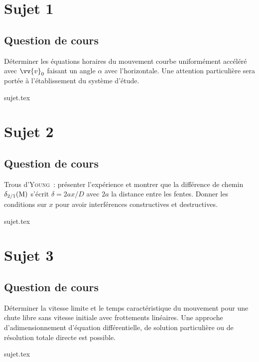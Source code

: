 \documentclass[a4paper, 11pt]{book}
\begin{document}
\chapter{Sujet 1}
\section{Question de cours}

Déterminer les équations horaires du mouvement courbe uniformément accéléré avec
$\vv{v}_0$ faisant un angle $\alpha$ avec l’horizontale. Une attention particulière
sera portée à l’établissement du système d’étude.

\resetQ
{sujet.tex}

\chapter{Sujet 2}
\section{Question de cours}
Trous d'\textsc{Young}~: présenter l'expérience et montrer que la différence de
chemin $\delta_{2/1}({\rm M})$ s'écrit $\delta = 2ax/D$ avec $2a$ la distance
entre les fentes. Donner les conditions sur $x$ pour avoir interférences
constructives et destructives.

\resetQ
{sujet.tex}


\chapter{Sujet 3}
\section{Question de cours}

Déterminer la vitesse limite et le temps caractéristique du mouvement pour une
chute libre sans vitesse initiale avec frottements linéaires. Une approche
d’adimensionnement d’équation différentielle, de solution particulière ou de
résolution totale directe est possible.

\resetQ
{sujet.tex}

\label{LastPage}
\end{document}
